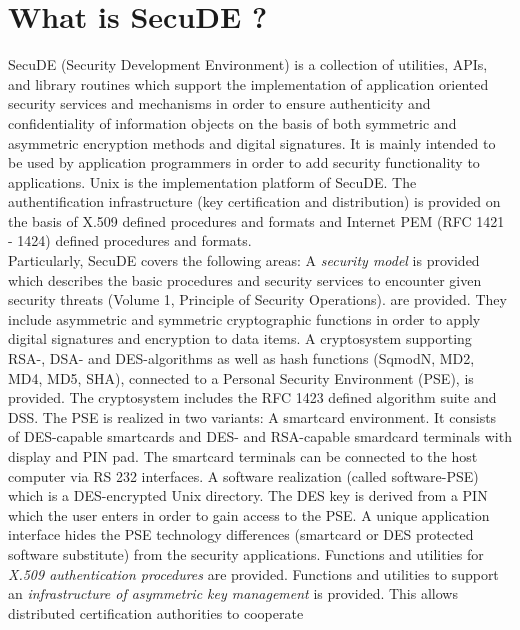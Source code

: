 \section{What is SecuDE ?}
\pagestyle{myheadings}
SecuDE (Security Development Environment) is a collection of utilities, APIs, 
and library routines which support the implementation of
application oriented security services and mechanisms in order to ensure authenticity and 
confidentiality of information objects on the basis of both symmetric and
asymmetric encryption methods and digital signatures. It is mainly intended to be
used by application programmers in order to add security functionality to applications.
Unix is the implementation platform of SecuDE. The authentification infrastructure
(key certification and distribution) is provided on the basis of X.509 defined 
procedures and formats and Internet PEM (RFC 1421 - 1424) defined procedures and formats.
\\[1em]
Particularly, SecuDE covers the following areas:
\be
\m A {\em security model} is provided which describes the basic 
   procedures and security services 
   to encounter given security threats (Volume 1, Principle of Security Operations).
 are provided. They include
   asymmetric and symmetric cryptographic functions in order to apply
   digital signatures and encryption to data items.
   A cryptosystem supporting RSA-, DSA- and DES-algorithms
   as well as hash functions (SqmodN, MD2, MD4, MD5, SHA), connected
   to a Personal Security Environment (PSE),
   is provided. The cryptosystem includes the RFC 1423 defined algorithm
   suite and DSS. The PSE is realized in two variants:
   \bi
   \m A smartcard environment. It consists of DES-capable smartcards
        and DES- and RSA-capable smardcard terminals with display
        and PIN pad. The smartcard terminals can be connected to the host
        computer via RS 232 interfaces.
   \m A software realization (called software-PSE) which is a 
         DES-encrypted Unix directory. The DES key is derived from
         a PIN which the user enters in order to gain access to the PSE.
   \ei
   A unique application interface hides the
   PSE technology differences (smartcard or DES protected software substitute)
   from the security applications.
 \m Functions and utilities for {\em X.509 authentication procedures}
   are provided.
\m Functions and utilities to support an {\em infrastructure of
   asymmetric key management}
   is provided.
   This allows distributed certification authorities to cooperate
